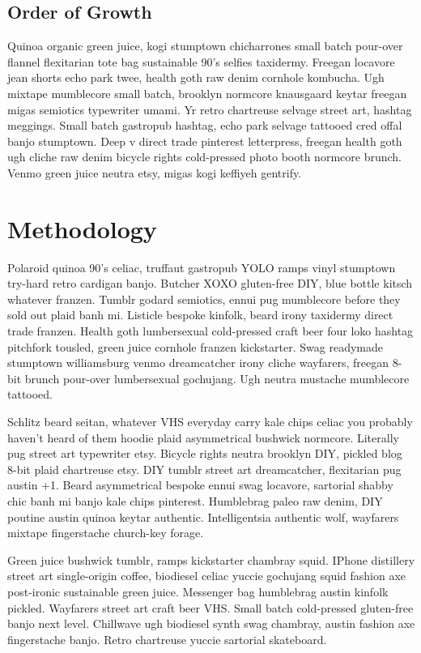 \documentclass[12pt]{article}
\begin{document}
\subsection{Order of Growth}
Quinoa organic green juice, kogi stumptown chicharrones small batch pour-over flannel flexitarian tote bag sustainable 90's selfies taxidermy. Freegan locavore jean shorts echo park twee, health goth raw denim cornhole kombucha. Ugh mixtape mumblecore small batch, brooklyn normcore knausgaard keytar freegan migas semiotics typewriter umami. Yr retro chartreuse selvage street art, hashtag meggings. Small batch gastropub hashtag, echo park selvage tattooed cred offal banjo stumptown. Deep v direct trade pinterest letterpress, freegan health goth ugh cliche raw denim bicycle rights cold-pressed photo booth normcore brunch. Venmo green juice neutra etsy, migas kogi keffiyeh gentrify.
\section{Methodology}
Polaroid quinoa 90's celiac, truffaut gastropub YOLO ramps vinyl stumptown try-hard retro cardigan banjo. Butcher XOXO gluten-free DIY, blue bottle kitsch whatever franzen. Tumblr godard semiotics, ennui pug mumblecore before they sold out plaid banh mi. Listicle bespoke kinfolk, beard irony taxidermy direct trade franzen. Health goth lumbersexual cold-pressed craft beer four loko hashtag pitchfork tousled, green juice cornhole franzen kickstarter. Swag readymade stumptown williamsburg venmo dreamcatcher irony cliche wayfarers, freegan 8-bit brunch pour-over lumbersexual gochujang. Ugh neutra mustache mumblecore tattooed.

Schlitz beard seitan, whatever VHS everyday carry kale chips celiac you probably haven't heard of them hoodie plaid asymmetrical bushwick normcore. Literally pug street art typewriter etsy. Bicycle rights neutra brooklyn DIY, pickled blog 8-bit plaid chartreuse etsy. DIY tumblr street art dreamcatcher, flexitarian pug austin +1. Beard asymmetrical bespoke ennui swag locavore, sartorial shabby chic banh mi banjo kale chips pinterest. Humblebrag paleo raw denim, DIY poutine austin quinoa keytar authentic. Intelligentsia authentic wolf, wayfarers mixtape fingerstache church-key forage.

Green juice bushwick tumblr, ramps kickstarter chambray squid. IPhone distillery street art single-origin coffee, biodiesel celiac yuccie gochujang squid fashion axe post-ironic sustainable green juice. Messenger bag humblebrag austin kinfolk pickled. Wayfarers street art craft beer VHS. Small batch cold-pressed gluten-free banjo next level. Chillwave ugh biodiesel synth swag chambray, austin fashion axe fingerstache banjo. Retro chartreuse yuccie sartorial skateboard.
\end{document}
